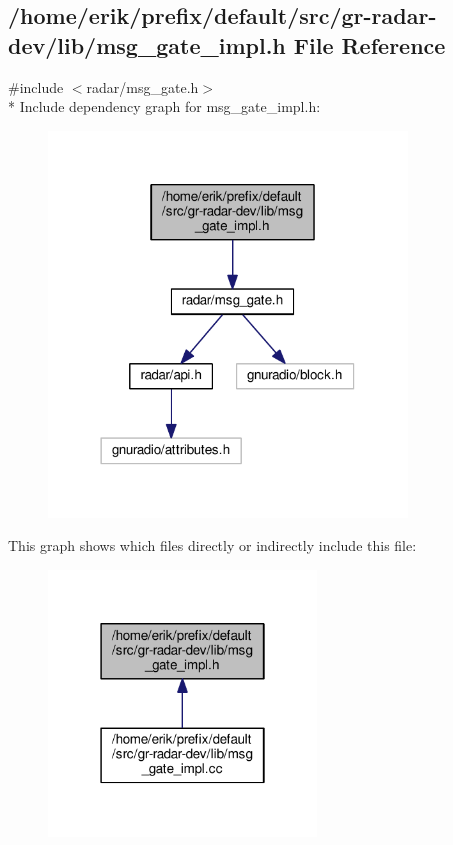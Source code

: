\subsection{/home/erik/prefix/default/src/gr-\/radar-\/dev/lib/msg\+\_\+gate\+\_\+impl.h File Reference}
\label{msg__gate__impl_8h}
{\ttfamily \#include $<$radar/msg\+\_\+gate.\+h$>$}\\*
Include dependency graph for msg\+\_\+gate\+\_\+impl.\+h\+:
\nopagebreak
\begin{figure}[H]
\begin{center}
\leavevmode
\includegraphics[width=270pt]{d6/d71/msg__gate__impl_8h__incl}
\end{center}
\end{figure}
This graph shows which files directly or indirectly include this file\+:
\nopagebreak
\begin{figure}[H]
\begin{center}
\leavevmode
\includegraphics[width=202pt]{d3/dbb/msg__gate__impl_8h__dep__incl}
\end{center}
\end{figure}

